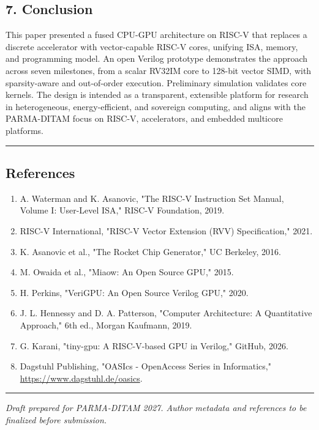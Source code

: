 \subsection{7. Conclusion}\label{7-conclusion}

This paper presented a fused CPU-GPU architecture on RISC-V that
replaces a discrete accelerator with vector-capable RISC-V cores,
unifying ISA, memory, and programming model. An open Verilog prototype
demonstrates the approach across seven milestones, from a scalar RV32IM
core to 128-bit vector SIMD, with sparsity-aware and out-of-order
execution. Preliminary simulation validates core kernels. The design is
intended as a transparent, extensible platform for research in
heterogeneous, energy-efficient, and sovereign computing, and aligns
with the PARMA-DITAM focus on RISC-V, accelerators, and embedded
multicore platforms.

\begin{center}\rule{0.5\linewidth}{0.5pt}\end{center}

\subsection{References}\label{references}

\begin{enumerate}
\def\labelenumi{\arabic{enumi}.}
\tightlist
\item
  A. Waterman and K. Asanovic, "The RISC-V Instruction Set Manual,
  Volume I: User-Level ISA," RISC-V Foundation, 2019.
\item
  RISC-V International, "RISC-V Vector Extension (RVV) Specification,"
  2021.
\item
  K. Asanovic et al., "The Rocket Chip Generator," UC Berkeley, 2016.
\item
  M. Owaida et al., "Miaow: An Open Source GPU," 2015.
\item
  H. Perkins, "VeriGPU: An Open Source Verilog GPU," 2020.
\item
  J. L. Hennessy and D. A. Patterson, "Computer Architecture: A
  Quantitative Approach," 6th ed., Morgan Kaufmann, 2019.
\item
  G. Karani, "tiny-gpu: A RISC-V-based GPU in Verilog," GitHub, 2026.
\item
  Dagstuhl Publishing, "OASIcs - OpenAccess Series in Informatics,"
  \url{https://www.dagstuhl.de/oasics}.
\end{enumerate}

\begin{center}\rule{0.5\linewidth}{0.5pt}\end{center}

\emph{Draft prepared for PARMA-DITAM 2027. Author metadata and
references to be finalized before submission.}
